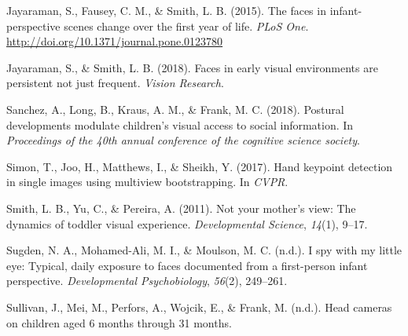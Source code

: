 \documentclass[10pt, letterpaper]{article}
\begin{document}
\leavevmode\hypertarget{ref-Jayaraman2015}{}%
Jayaraman, S., Fausey, C. M., \& Smith, L. B. (2015). The faces in
infant-perspective scenes change over the first year of life. \emph{PLoS
One}. \url{http://doi.org/10.1371/journal.pone.0123780}

\leavevmode\hypertarget{ref-Jayaraman2018}{}%
Jayaraman, S., \& Smith, L. B. (2018). Faces in early visual
environments are persistent not just frequent. \emph{Vision Research}.

\leavevmode\hypertarget{ref-Sanchez2018}{}%
Sanchez, A., Long, B., Kraus, A. M., \& Frank, M. C. (2018). Postural
developments modulate children's visual access to social information. In
\emph{Proceedings of the 40th annual conference of the cognitive science
society}.

\leavevmode\hypertarget{ref-Simon2017hand}{}%
Simon, T., Joo, H., Matthews, I., \& Sheikh, Y. (2017). Hand keypoint
detection in single images using multiview bootstrapping. In
\emph{CVPR}.

\leavevmode\hypertarget{ref-Smith2011}{}%
Smith, L. B., Yu, C., \& Pereira, A. (2011). Not your mother's view: The
dynamics of toddler visual experience. \emph{Developmental Science},
\emph{14}(1), 9--17.

\leavevmode\hypertarget{ref-Sugden2014}{}%
Sugden, N. A., Mohamed-Ali, M. I., \& Moulson, M. C. (n.d.). I spy with
my little eye: Typical, daily exposure to faces documented from a
first-person infant perspective. \emph{Developmental Psychobiology},
\emph{56}(2), 249--261.

\leavevmode\hypertarget{ref-SAYcam}{}%
Sullivan, J., Mei, M., Perfors, A., Wojcik, E., \& Frank, M. (n.d.).
Head cameras on children aged 6 months through 31 months.


\end{document}
